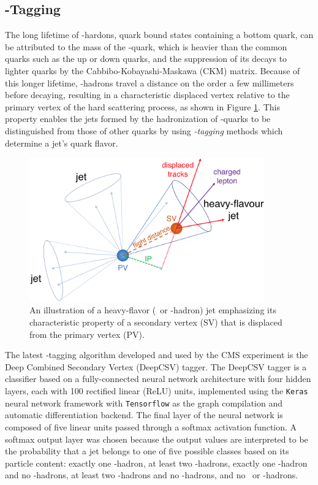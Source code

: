\subsection{\qrkb-Tagging}

The long lifetime of \qrkb-hardons, quark bound states containing a bottom quark, can be attributed to the mass of the \qrkb-quark, which is heavier than the common quarks such as the up or down quarks, and the suppression of its decays to lighter quarks by the Cabbibo-Kobayashi-Maskawa (CKM) matrix. Because of this longer lifetime, \qrkb-hadrons travel a distance on the order a few millimeters before decaying, resulting in a characteristic displaced vertex relative to the primary vertex of the hard scattering process, as shown in Figure \ref{fig:secondary_vertex}. This property enables the jets formed by the hadronization of \qrkb-quarks to be distinguished from those of other quarks by using \textit{\qrkb-tagging} methods which determine a jet's quark flavor.

\begin{figure}[htbp]
  \centering
    \includegraphics[width=4in]{images/secondary_vertex}
    \caption[Illustration of a Heavy-Flavor Jet]{An illustration of a heavy-flavor (\qrkc\ or \qrkb-hadron) jet emphasizing its characteristic property of a secondary vertex (SV) that is displaced from the primary vertex (PV).\cite{CMSBTAG}}
    \label{fig:secondary_vertex}
\end{figure}

The latest \qrkb-tagging algorithm developed and used by the CMS experiment is the Deep Combined Secondary Vertex (DeepCSV)\cite{CMSBTAG} tagger. The DeepCSV tagger is a classifier based on a fully-connected neural network architecture with four hidden layers, each with 100 rectified linear (ReLU) units, implemented using the \texttt{Keras}\cite{KERAS} neural network framework with \texttt{Tensorflow}\cite{TENSORFLOW} as the graph compilation and automatic differentiation backend. The final layer of the neural network is composed of five linear units passed through a softmax activation function. A softmax output layer was chosen because the output values are interpreted to be the probability that a jet belongs to one of five possible classes based on its particle content: exactly one \qrkb-hadron, at least two \qrkb-hadrons, exactly one \qrkc-hadron and no \qrkb-hadrons, at least two \qrkc-hadrons and no \qrkb-hadrons, and no \qrkc\ or \qrkb-hadrons.

